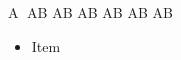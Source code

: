 \documentclass{article}
\begin{document}
\shipout\hbox{\texteuro}
\shipout\hbox{\texttimes}
\shipout\hbox{\textdiv}
\shipout\hbox{}
\shipout\hbox{}
\shipout\hbox{\textasteriskcentered}
\shipout\hbox{\textcircled{A}}
\normalfont{}\selectfont
\shipout\hbox{A\textcompwordmark B}
\normalfont{}\selectfont
\shipout\hbox{A\textcompwordmark B}
\normalfont{}\selectfont
\shipout\hbox{A\textcompwordmark B}
\normalfont{}\selectfont
\shipout\hbox{A\textcompwordmark B}
\normalfont{}\selectfont
\shipout\hbox{A\textcompwordmark B}
\normalfont{}\selectfont
\shipout\hbox{A\textcompwordmark B}
\normalfont\setcounter{page}{1}
\begin{itemize}\item Item\end{itemize}
\end{document}

